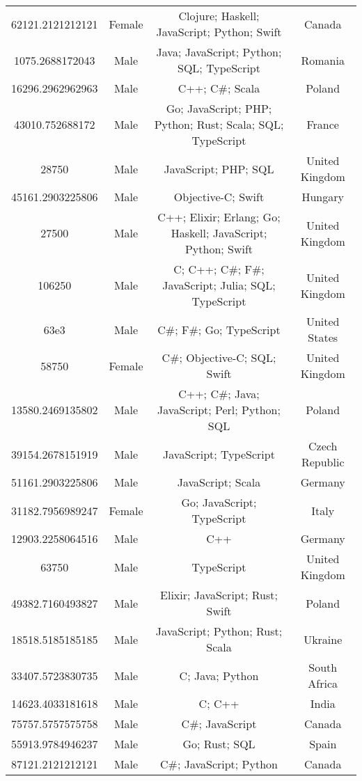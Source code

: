 \begin{center}
\begin{tabular}{ |c|c|c|c| }
62121.2121212121  &  Female  &  Clojure; Haskell; JavaScript; Python; Swift  &  Canada  \\ 
1075.2688172043  &  Male  &  Java; JavaScript; Python; SQL; TypeScript  &  Romania  \\ 
16296.2962962963  &  Male  &  C++; C\#; Scala  &  Poland  \\ 
43010.752688172  &  Male  &  Go; JavaScript; PHP; Python; Rust; Scala; SQL; TypeScript  &  France  \\ 
28750  &  Male  &  JavaScript; PHP; SQL  &  United Kingdom  \\ 
45161.2903225806  &  Male  &  Objective-C; Swift  &  Hungary  \\ 
27500  &  Male  &  C++; Elixir; Erlang; Go; Haskell; JavaScript; Python; Swift  &  United Kingdom  \\ 
106250  &  Male  &  C; C++; C\#; F\#; JavaScript; Julia; SQL; TypeScript  &  United Kingdom  \\ 
63e3  &  Male  &  C\#; F\#; Go; TypeScript  &  United States  \\ 
58750  &  Female  &  C\#; Objective-C; SQL; Swift  &  United Kingdom  \\ 
13580.2469135802  &  Male  &  C++; C\#; Java; JavaScript; Perl; Python; SQL  &  Poland  \\ 
39154.2678151919  &  Male  &  JavaScript; TypeScript  &  Czech Republic  \\ 
51161.2903225806  &  Male  &  JavaScript; Scala  &  Germany  \\ 
31182.7956989247  &  Female  &  Go; JavaScript; TypeScript  &  Italy  \\ 
12903.2258064516  &  Male  &  C++  &  Germany  \\ 
63750  &  Male  &  TypeScript  &  United Kingdom  \\ 
49382.7160493827  &  Male  &  Elixir; JavaScript; Rust; Swift  &  Poland  \\ 
18518.5185185185  &  Male  &  JavaScript; Python; Rust; Scala  &  Ukraine  \\ 
33407.5723830735  &  Male  &  C; Java; Python  &  South Africa  \\ 
14623.4033181618  &  Male  &  C; C++  &  India  \\ 
75757.5757575758  &  Male  &  C\#; JavaScript  &  Canada  \\ 
55913.9784946237  &  Male  &  Go; Rust; SQL  &  Spain  \\ 
87121.2121212121  &  Male  &  C\#; JavaScript; Python  &  Canada  \\ 

\end{tabular}
\end{center}
